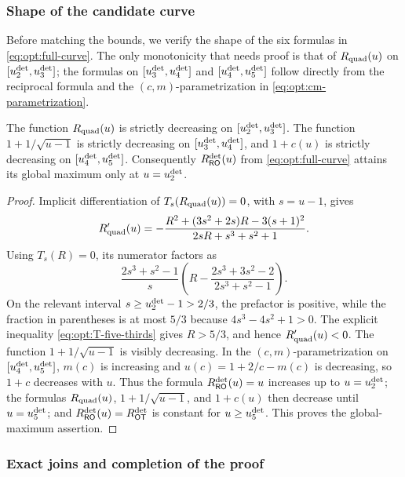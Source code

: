 \subsubsection{Shape of the candidate curve}

Before matching the bounds, we verify the shape of the six formulas in
\cref{eq:opt:full-curve}.  The only monotonicity that needs proof is that of
$R_{\mathrm{quad}}(u)$ on $[u_{2}^{\mathrm{det}},u_{3}^{\mathrm{det}}]$; the formulas on
$[u_{3}^{\mathrm{det}},u_{4}^{\mathrm{det}}]$ and $[u_{4}^{\mathrm{det}},u_{5}^{\mathrm{det}}]$ follow directly from the
reciprocal formula and the $(c,m)$-parametrization in
\cref{eq:opt:cm-parametrization}.

\begin{lemma}
\label{lem:opt:curve-monotonicity}
The function $R_{\mathrm{quad}}(u)$ is strictly decreasing on
$[u_{2}^{\mathrm{det}},u_{3}^{\mathrm{det}}]$.  The function $1+1/\sqrt{u-1}$ is strictly
decreasing on $[u_{3}^{\mathrm{det}},u_{4}^{\mathrm{det}}]$, and $1+c(u)$ is strictly decreasing
on $[u_{4}^{\mathrm{det}},u_{5}^{\mathrm{det}}]$.  Consequently $R_{\mathsf{RO}}^{\mathrm{det}}(u)$ from
\cref{eq:opt:full-curve} attains its global maximum only at $u=u_{2}^{\mathrm{det}}$.
\end{lemma}

\begin{proof}
Implicit differentiation of $T_s(R_{\mathrm{quad}}(u))=0$, with $s=u-1$, gives
\begin{equation}
 R_{\mathrm{quad}}'(u)=
 -\frac{R^2+(3s^2+2s)R-3(s+1)^2}
 {2sR+s^3+s^2+1}.
 \label{eq:opt:Rquad-derivative}
\end{equation}
Using $T_s(R)=0$, its numerator factors as
\[
 \frac{2s^3+s^2-1}{s}
 \left(R-
 \frac{2s^3+3s^2-2}{2s^3+s^2-1}\right).
\]
On the relevant interval $s\ge u_{2}^{\mathrm{det}}-1>2/3$, the prefactor is
positive, while the fraction in parentheses is at most $5/3$ because
$4s^3-4s^2+1>0$.  The explicit inequality
\eqref{eq:opt:T-five-thirds} gives $R>5/3$, and hence
$R_{\mathrm{quad}}'(u)<0$.  The function $1+1/\sqrt{u-1}$ is visibly decreasing.  In
the $(c,m)$-parametrization on $[u_{4}^{\mathrm{det}},u_{5}^{\mathrm{det}}]$, $m(c)$ is increasing and
$u(c)=1+2/c-m(c)$ is decreasing, so $1+c$ decreases with $u$.
Thus the formula $R_{\mathsf{RO}}^{\mathrm{det}}(u)=u$ increases up to $u=u_{2}^{\mathrm{det}}$; the formulas
$R_{\mathrm{quad}}(u)$, $1+1/\sqrt{u-1}$, and $1+c(u)$ then decrease until
$u=u_{5}^{\mathrm{det}}$; and $R_{\mathsf{RO}}^{\mathrm{det}}(u)=R_{\mathsf{OT}}^{\mathrm{det}}$ is constant for
$u\ge u_{5}^{\mathrm{det}}$.  This proves the global-maximum assertion.
\end{proof}

\subsubsection{Exact joins and completion of the proof}

